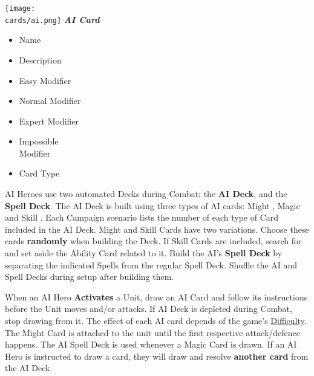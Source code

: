 \begin{multicols}{2}
\begin{multicols*}{2}
  \begin{center}
    \vspace*{-1.5em}\texttt{[image: \\cards/ai.png]}
    \phantom{\ldots\ldots}\footnotesize{\textbf{\textit{\textcolor{darkcandyapplered}{AI Card}}}}
  \end{center}
  \vspace*{\fill}
  \columnbreak
  \scriptsize
  \begin{itemize}[itemsep=0pt]
    \item[\textbf{1.}] Name
    \item[\textbf{2.}] Description
    \item[\textbf{3.}] Easy Modifier
    \item[\textbf{4.}] Normal Modifier
    \item[\textbf{5.}] Expert Modifier
    \item[\textbf{6.}] Impossible\\Modifier
    \item[\textbf{7.}] Card Type
  \end{itemize}\vspace*{\fill}
\end{multicols*}

AI Heroes use two automated Decks during Combat: the \textbf{AI Deck}, and the \textbf{Spell Deck}.
The AI Deck is built using three types of AI cards: Might , Magic  and Skill .
Each Campaign scenario lists the number of each type of Card included in the AI Deck.
Might  and Skill  Cards have two variations. Choose these cards \textbf{randomly} when building the Deck.
If Skill Cards are included, search for and set aside the Ability Card related to it.
Build the AI's \textbf{Spell Deck} by separating the indicated Spells from the regular Spell Deck.
Shuffle the AI and Spell Decks during setup after building them.

When an AI Hero \textbf{Activates} a Unit, draw an AI Card and follow its instructions before the Unit moves and/or attacks.
If AI Deck is depleted during Combat, stop drawing from it.
The effect of each AI card depends of the game's \hyperlink{Difficulty}{Difficulty}.
The Might Card  is attached to the unit until the first respective attack/defence happens.
The AI Spell Deck is used whenever a Magic Card  is drawn.
If an AI Hero is instructed to draw a card, they will draw and resolve \textbf{another card} from the AI Deck.


\end{multicols}
